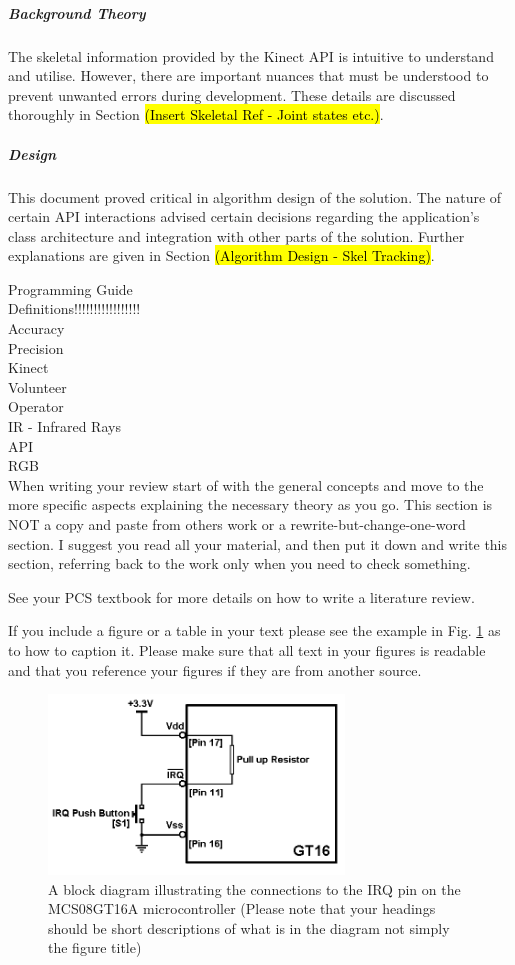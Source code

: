 \subparagraph{Background Theory}
The skeletal information provided by the Kinect API is intuitive to understand and utilise. However, there are important nuances that must be understood to prevent unwanted errors during development. These details are discussed thoroughly in Section \hl{(Insert Skeletal Ref - Joint states etc.)}. 

\subparagraph{Design}
This document proved critical in algorithm design of the solution. The nature of certain API interactions advised certain decisions regarding the application's class architecture and integration with other parts of the solution. Further explanations are given in Section \hl{(Algorithm Design - Skel Tracking)}. 

Programming Guide\\

Definitions!!!!!!!!!!!!!!!!!\\
Accuracy\\
Precision\\
Kinect\\
Volunteer\\
Operator\\
IR - Infrared Rays\\
API\\
RGB\\


When writing your review start of with the general concepts and move to the more specific aspects
explaining the necessary theory as you go. This section is NOT a copy and paste from others work or a
rewrite-but-change-one-word section. I suggest you read all your material, and then put it down and
write this section, referring back to the work only when you need to check something.

See your PCS textbook for more details on how to write a literature review.

If you include a figure or a table in your text please see the example in Fig. \ref{fig:model} as to how to caption it.
Please make sure that all text in your figures is readable and that you reference your figures if they are
from another source.

\begin{figure}[ht]
\centering
\includegraphics[width=0.7\textwidth]{model.png}
\caption{A block diagram illustrating the connections to the IRQ pin on the MCS08GT16A microcontroller (Please
note that your headings should be short descriptions of what is in the diagram not simply the figure title)}
\label{fig:model}
\end{figure}

